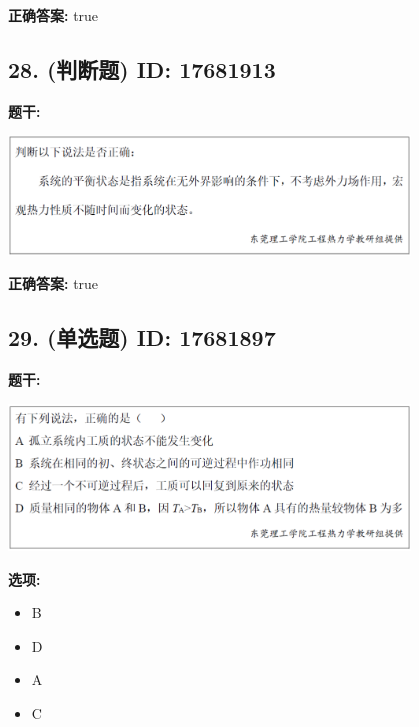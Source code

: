 \documentclass[12pt]{article}
\begin{document}
\textbf{正确答案:}
true

\vspace{0.5em}\hrulefill\vspace{1em}

\subsection*{28. (判断题) \small ID: 17681913}

\textbf{题干:}


\begin{center}\includegraphics[width=0.8\textwidth, height=0.25\textheight, keepaspectratio]{question_28_17681913/title_img_1.png}\end{center}

\textbf{正确答案:}
true

\vspace{0.5em}\hrulefill\vspace{1em}

\subsection*{29. (单选题) \small ID: 17681897}

\textbf{题干:}


\begin{center}\includegraphics[width=0.8\textwidth, height=0.25\textheight, keepaspectratio]{question_29_17681897/title_img_1.png}\end{center}

\textbf{选项:}
\begin{itemize}[leftmargin=*]
  \item B

  \item D

  \item A

  \item C

\end{itemize}
\end{document}
